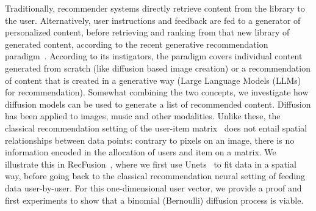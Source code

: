 Traditionally, recommender systems directly retrieve content from the library to the user. Alternatively, user instructions and feedback are fed to a generator of personalized content, before retrieving and ranking from that new library of generated content, according to the recent generative recommendation paradigm~\cite{generativeReco}. According to its instigators, the paradigm covers individual content generated from scratch (like diffusion based image creation) or a recommendation of content that is created in a generative way (Large Language Models (LLMs) for recommendation). Somewhat combining the two concepts, we investigate how diffusion models can be used to generate a list of recommended content. Diffusion has been applied to images, music and other modalities. Unlike these, the classical recommendation setting of the user-item matrix~\cite{MF} does not entail spatial relationships between data points: contrary to pixels on an image, there is no information encoded in the allocation of users and item on a matrix. We illustrate this in RecFusion~\cite{recfusion}, where we first use Unets~\cite{unet} to fit data in a spatial way, before going back to the classical recommendation neural setting of feeding data user-by-user. For this one-dimensional user vector, we provide a proof and first experiments to show that a binomial (Bernoulli) diffusion process is viable.

